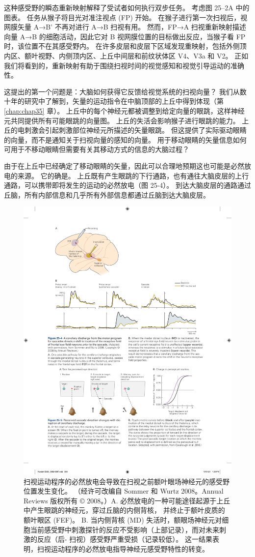 这种感受野的瞬态重新映射解释了受试者如何执行双步任务。 
考虑图 25–2A 中的图表。 
任务从猴子将目光对准注视点 (FP) 开始。
在猴子进行第一次扫视后，视网膜矢量 A→B' 不再对进行 A→B 扫视有用。
然而，FP→A 扫视重新映射描述向量 A→B 的细胞活动，因此它对 B 视网膜位置的目标做出反应，当猴子看 FP 时，该位置不在其感受野内。
在许多皮层和皮层下区域发现重映射，包括外侧顶内区、额叶视野、内侧顶内区、上丘中间层和前纹状体区 V4、V3a 和 V2。
正如我们将看到的，重新映射有助于围绕扫视时间的视觉感知和视觉引导运动的准确性。


这提出的第一个问题是：大脑如何获得它反馈给视觉系统的扫视向量？
我们从数十年的研究中了解到，矢量的运动指令在中脑顶部的上丘中得到体现（第 \ref{chap:chap35} 章）。
上丘中的每个神经元都被调整到给定向量的眼跳，这样神经元共同提供所有可能眼跳的向量图。
上丘的失活会影响猴子进行眼跳的能力。
上丘的电刺激会引起刺激部位神经元所描述的矢量眼跳。 
但这提供了实际驱动眼睛的向量，而不是通知关于扫视向量的感知的向量。
用于移动眼睛的矢量信息如何可用于不移动眼睛但需要有关其移动方式的信息的大脑过程？


由于在上丘中已经确定了移动眼睛的矢量，因此可以合理地预期这也可能是必然放电的来源。
它的确是。
上丘既有产生眼跳的下行通路，也有通往大脑皮层的上行通路，可以携带即将发生的运动的必然放电（图 25-4）。 
到达大脑皮层的通路通过丘脑，所有内部信息和几乎所有外部信息都通过丘脑到达大脑皮层。


\begin{figure}[htbp]
	\centering
	\includegraphics[width=0.8\linewidth]{chap25/fig_25_4}
	\caption{扫视运动程序的必然放电会导致在扫视之前额叶眼场神经元的感受野位置发生变化。 （经许可改编自 Sommer 和 Wurtz 2008。Annual Reviews 版权所有 © 2008。）A. 必然放电的一种可能途径起源于上丘中产生眼跳的神经元，穿过丘脑的内侧背核， 并终止于额叶皮质的额叶眼区 (FEF)。 B. 当内侧背核 (MD) 失活时，额眼场神经元对细胞当前感受野中刺激探针的反应不受影响（上部记录），而对未来刺激的反应（后- 扫视）感受野严重受损（记录较低）。 这一结果表明，扫视运动程序的必然放电指导神经元感受野特性的转变。}
	\label{fig:25_4}
\end{figure}


